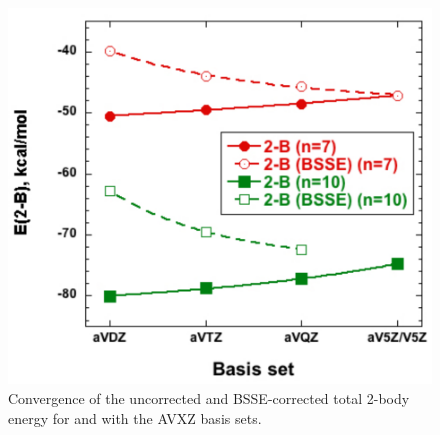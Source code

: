 \begin{figure}[t]
\uwsinglespace
\centering
\includegraphics[width=.7\textwidth]{Figures/Chapter_2/E_2B_7_10.pdf}
\begin{spacing}{1.0}
\caption[Convergence of the uncorrected and BSSE-corrected total 2-body energy for  and  with the AVXZ basis sets.]{Convergence of the uncorrected and BSSE-corrected total 2-body energy for  and  with the AVXZ basis sets.}\label{fig:MBE_I_F6}
\end{spacing}
\end{figure}